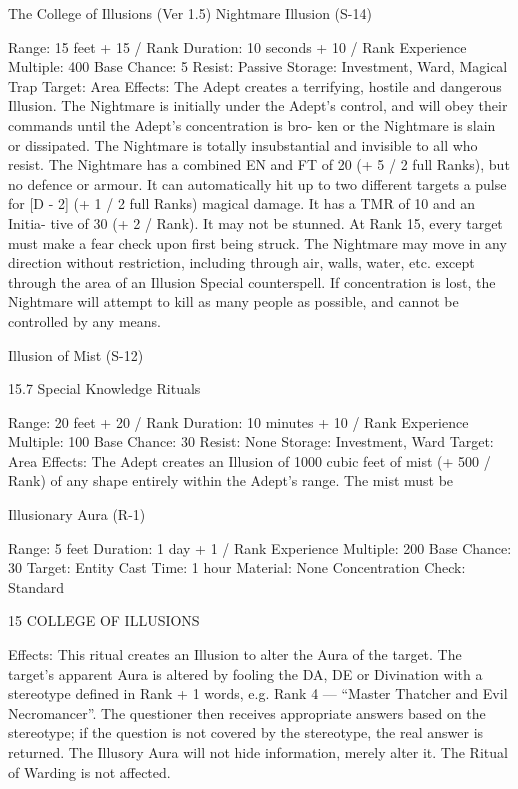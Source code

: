 \begin{Chapter}{The College of Illusions (Ver 1.5)}
Nightmare Illusion (S-14) 

Range: 15 feet + 15 / Rank 
Duration: 10 seconds + 10 / Rank 
Experience Multiple: 400 
Base Chance: 5%
Resist: Passive 
Storage: Investment, Ward, Magical Trap 
Target: Area 
Effects: The Adept creates a terrifying, hostile and 
dangerous  Illusion.  The  Nightmare  is  initially 
under  the  Adept’s  control,  and  will  obey  their 
commands  until  the  Adept’s  concentration  is  bro-
ken  or  the  Nightmare  is  slain  or  dissipated.  The 
Nightmare  is  totally  insubstantial  and  invisible  to 
all  who  resist.  The  Nightmare  has a combined  EN 
and FT of 20 (+ 5 / 2 full Ranks), but no defence or 
armour. It can automatically hit up to two different 
targets  a  pulse  for  [D  -  2]  (+  1  /  2  full  Ranks) 
magical damage. It has a TMR of 10 and an Initia-
tive  of  30  (+ 2 / Rank).  It  may  not  be  stunned.  At 
Rank 15, every target must make a fear check upon 
first being struck. The Nightmare may move in any 
direction without restriction, including through air, 
walls,  water,  etc.  except  through  the  area  of  an 
Illusion  Special  counterspell.  If  concentration  is 
lost,  the  Nightmare  will  attempt  to  kill  as  many 
people as possible, and cannot be controlled by any 
means. 

Illusion of Mist (S-12) 

15.7 Special Knowledge Rituals 

Range: 20 feet + 20 / Rank 
Duration: 10 minutes + 10 / Rank 
Experience Multiple: 100 
Base Chance: 30%
Resist: None 
Storage: Investment, Ward 
Target: Area 
Effects:  The  Adept  creates  an  Illusion  of  1000 
cubic  feet  of  mist  (+  500  /  Rank)  of  any  shape 
entirely within the Adept’s range. The mist must be 

Illusionary Aura (R-1) 

Range: 5 feet 
Duration: 1 day + 1 / Rank 
Experience Multiple: 200 
Base Chance: 30%
Target: Entity 
Cast Time: 1 hour 
Material: None 
Concentration Check: Standard 

15 COLLEGE OF ILLUSIONS 

Effects:  This  ritual  creates  an  Illusion  to  alter  the 
Aura  of  the  target.  The  target’s  apparent  Aura  is 
altered by fooling the DA, DE or Divination with a 
stereotype defined in Rank + 1 words, e.g. Rank 4 
—  “Master  Thatcher  and  Evil  Necromancer”.  The 
questioner then receives appropriate answers based 
on the stereotype; if the question is not covered by 
the  stereotype,  the  real  answer  is  returned.  The 
Illusory  Aura  will  not  hide  information,  merely 
alter it. The Ritual of Warding is not affected. 


\end{Chapter}
